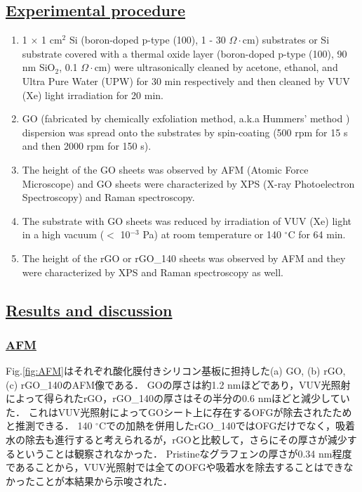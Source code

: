 \documentclass[platex,dvipdfmx]{jlreq}			%
\begin{document}
\subsection*{\ul{Experimental procedure}}
\begin{enumerate}
    \item 1 $\times$ 1 cm$^2$ Si (boron-doped p-type (100), 1 - 30 $\Omega\cdot$cm) substrates or Si substrate covered with a thermal oxide layer (boron-doped p-type (100), 90 nm SiO$_2$, 0.1 $\Omega\cdot$cm) were ultrasonically cleaned by acetone, ethanol, and Ultra Pure Water (UPW) for 30 min respectively and then cleaned by VUV (Xe) light irradiation for 20 min.
    \item GO (fabricated by chemically exfoliation method, a.k.a Hummers' method ) dispersion was spread onto the substrates by spin-coating (500 rpm for 15 s and then 2000 rpm for 150 s).
    \item The height of the GO sheets was observed by AFM (Atomic Force Microscope) and GO sheets were characterized by XPS (X-ray Photoelectron Spectroscopy) and Raman spectroscopy.
    \item The substrate with GO sheets was reduced by irradiation of VUV (Xe) light in a high vacuum ($<$ 10$^{-3}$ Pa) at room temperature or 140 ${}^\circ$C for 64 min.
    \item The height of the rGO or rGO\_140 sheets was observed by AFM and they were characterized by XPS and Raman spectroscopy as well.
\end{enumerate}

\subsection*{\ul{Results and discussion}}

\subsubsection*{\ul{AFM}}
Fig.\ref{fig:AFM}はそれぞれ酸化膜付きシリコン基板に担持した(a) GO, (b) rGO, (c) rGO\_140のAFM像である．
GOの厚さは約1.2 nmほどであり\supercite{tu_vacuum-ultraviolet_2015}，VUV光照射によって得られたrGO，rGO\_140の厚さはその半分の0.6 nmほどと減少していた．
これはVUV光照射によってGOシート上に存在するOFGが除去されたためと推測できる．
140 ${}^\circ$Cでの加熱を併用したrGO\_140ではOFGだけでなく，吸着水の除去も進行すると考えられるが，rGOと比較して，さらにその厚さが減少するということは観察されなかった．
Pristineなグラフェンの厚さが0.34 nm程度であることから，VUV光照射では全てのOFGや吸着水を除去することはできなかったことが本結果から示唆された．
\end{document}
